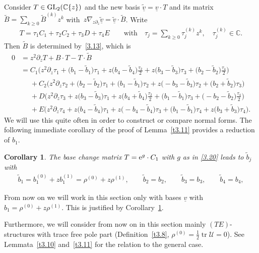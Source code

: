 \documentclass[pdftex]{sigma}%
\numberwithin{equation}{section}
\numberwithin{figure}{section}
\newcommand{\C}{{\mathbb C}}
\newcommand{\UU}{{\mathcal U}}
\newcommand{\www}{\widetilde}
\newcommand{\uuuu}{\underline}
\newcommand{\paa}{\partial}
\newcommand{\nnn}{\nabla}
\DeclareMathOperator{\tr}{tr}
\newtheorem{Corollary}[Theorem]{Corollary}
\begin{document}
Consider $T\in {\rm GL}_2(\C\{z\})$ and the new basis
$\uuuu{\www v}=\uuuu{v}\cdot T$ and its matrix
$\www B =\sum_{k\geq 0}\www B^{(k)}z^k$ with~$z\nnn_{z\paa_z}\uuuu{\www v}=\uuuu{\www v}\cdot\www B$.
Write
\begin{gather*}%
T=\tau_1C_1+\tau_2C_2+\tau_3D+\tau_4E\qquad\text{with}\quad
\tau_j=\sum_{k\geq 0}\tau_j^{(k)}z^k,\quad
\tau_j^{(k)}\in\C.
\end{gather*}
Then $\www B$ is determined by~\eqref{3.13}, which is
\begin{align}
0&=z^2\paa_zT+B\cdot T-T\cdot\www B\nonumber
\\
&= C_1\bigg(z^2\paa_z\tau_1+\big(b_1-\www b_1\big)\tau_1
+z\big(b_4-\www b_4\big)\frac{\tau_2}{2}+z\big(b_3-\www b_3\big)\tau_3
+\big(b_2-\www b_2\big)\frac{\tau_4}{2}\bigg)\nonumber
\\
&\phantom{=}+ C_2\big(z^2\paa_z \tau_2+\big(b_2-\www b_2\big)\tau_1
+\big(b_1-\www b_1\big)\tau_2 + z\big({-}b_3-\www b_3\big)\tau_2
+ \big(b_2+\www b_2\big)\tau_3\big)\nonumber
\\
&\phantom{=}+ D\bigg(z^2\paa_z\tau_3+z\big(b_3-\www b_3\big)\tau_1
+z\big(b_4+\www b_4\big)\frac{\tau_2}{2}+\big(b_1-\www b_1\big)\tau_3
+ \big({-}b_2-\www b_2\big)\frac{\tau_4}{2}\bigg)\nonumber
\\
&\phantom{=}+ E\big(z^2\paa_z\tau_4 +z\big(b_4-\www b_4\big)\tau_1
+z\big({-}b_4-\www b_4\big)\tau_3+\big(b_1-\www b_1\big)\tau_4
+z\big(b_3+\www b_3\big)\tau_4\big).\label{4.19}
\end{align}
We will use this quite often in order to construct
or compare normal forms. The following immediate corollary
of the proof of
Lemma~\ref{t3.11} provides a reduction of $b_1$.

\begin{Corollary}\label{t4.8}
The base change matrix $T={\rm e}^g\cdot C_1$ with $g$ as in
\eqref{3.20} leads to $\www b_j$ with
\begin{gather*}%
\www b_1=b_1^{(0)}+zb_1^{(1)}=\rho^{(0)}+z \rho^{(1)},\qquad
\www b_2=b_2,\qquad \www b_3=b_3,\qquad \www b_4=b_4,
\end{gather*}
\end{Corollary}

From now on we will work in this section only with bases
$\uuuu{v}$ with $b_1=\rho^{(0)}+z \rho^{(1)}$. This is justified
by Corollary~\ref{t4.8}.

Furthermore, we will consider from now on in this section
mainly $(TE)$-structures with trace free pole part
\big(Definition~\ref{t3.8}, $\rho^{(0)}=\frac{1}{2}\tr\UU=0$\big).
See Lemmata~\ref{t3.10} and~\ref{t3.11} for the
relation to the general case.
\end{document}
